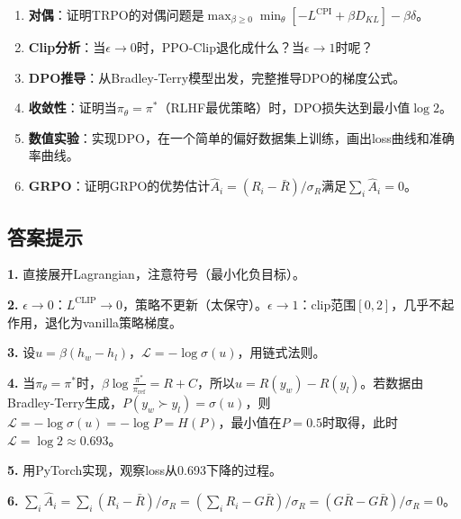 \documentclass[11pt,a4paper]{article}
\theoremstyle{definition}
\begin{document}
\begin{enumerate}
    \item \textbf{对偶}：证明TRPO的对偶问题是$\max_{\beta \geq 0} \min_\theta [-L^{\text{CPI}} + \beta D_{KL}] - \beta\delta$。
    
    \item \textbf{Clip分析}：当$\epsilon \to 0$时，PPO-Clip退化成什么？当$\epsilon \to 1$时呢？
    
    \item \textbf{DPO推导}：从Bradley-Terry模型出发，完整推导DPO的梯度公式。
    
    \item \textbf{收敛性}：证明当$\pi_\theta = \pi^*$（RLHF最优策略）时，DPO损失达到最小值$\log 2$。
    
    \item \textbf{数值实验}：实现DPO，在一个简单的偏好数据集上训练，画出loss曲线和准确率曲线。
    
    \item \textbf{GRPO}：证明GRPO的优势估计$\hat{A}_i = (R_i - \bar{R})/\sigma_R$满足$\sum_i \hat{A}_i = 0$。
\end{enumerate}

\subsection*{答案提示}

\textbf{1.} 直接展开Lagrangian，注意符号（最小化负目标）。

\textbf{2.} $\epsilon \to 0$：$L^{\text{CLIP}} \to 0$，策略不更新（太保守）。$\epsilon \to 1$：clip范围$[0, 2]$，几乎不起作用，退化为vanilla策略梯度。

\textbf{3.} 设$u = \beta(h_w - h_l)$，$\mathcal{L} = -\log\sigma(u)$，用链式法则。

\textbf{4.} 当$\pi_\theta = \pi^*$时，$\beta \log\frac{\pi^*}{\pi_{\text{ref}}} = R + C$，所以$u = R(y_w) - R(y_l)$。若数据由Bradley-Terry生成，$P(y_w \succ y_l) = \sigma(u)$，则$\mathcal{L} = -\log\sigma(u) = -\log P = H(P)$，最小值在$P = 0.5$时取得，此时$\mathcal{L} = \log 2 \approx 0.693$。

\textbf{5.} 用PyTorch实现，观察loss从0.693下降的过程。

\textbf{6.} $\sum_i \hat{A}_i = \sum_i (R_i - \bar{R})/\sigma_R = (\sum_i R_i - G\bar{R})/\sigma_R = (G\bar{R} - G\bar{R})/\sigma_R = 0$。
\end{document}
